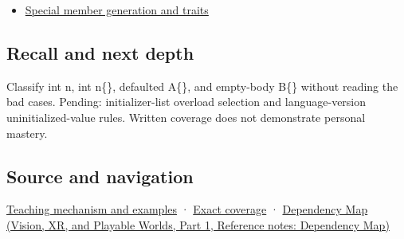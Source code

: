 \hypertarget{appendix-ba8c1a9fe03f-used-by}{}

\begin{itemize}
\tightlist
\item
  \hyperref[appendix-42e02a12c694]{Special member generation and traits}
\end{itemize}

\subsection{Recall and next depth}\label{appendix-ba8c1a9fe03f-recall-and-next-depth}

\hypertarget{appendix-ba8c1a9fe03f-recall-and-next-depth}{}

Classify int n, int n\{\}, defaulted A\{\}, and empty-body B\{\} without reading the bad cases. Pending: initializer-list overload selection and language-version uninitialized-value rules. Written coverage does not demonstrate personal mastery.

\subsection{Source and navigation}\label{appendix-ba8c1a9fe03f-source-and-navigation}

\hypertarget{appendix-ba8c1a9fe03f-source-and-navigation}{}

\hyperref[01-foundations-i-ch003-empty-syntax-does-not-promise-initialized-members]{Teaching mechanism and examples} · \hyperref[appendix-fd090d982a15-m009---parts-127-147]{Exact coverage} · \href{../07-Vision-XR-and-Playable-Worlds-P01/main.pdf\#appendix-4ad47bdd269a}{Dependency Map (Vision, XR, and Playable Worlds, Part 1, Reference notes: Dependency Map)}
